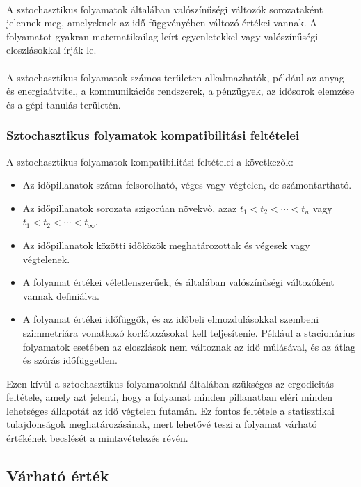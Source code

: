 \documentclass[11pt,a4paper]{article}
\begin{document}
				\paragraph{}
					A sztochasztikus folyamatok általában valószínűségi változók sorozataként jelennek meg, amelyeknek az idő függvényében változó értékei vannak. A folyamatot gyakran matematikailag leírt egyenletekkel vagy valószínűségi eloszlásokkal írják le.
				\paragraph{}
					A sztochasztikus folyamatok számos területen alkalmazhatók, például az anyag- és energiaátvitel, a kommunikációs rendszerek, a pénzügyek, az idősorok elemzése és a gépi tanulás területén.
				\subsubsection{Sztochasztikus folyamatok kompatibilitási feltételei}
					A sztochasztikus folyamatok kompatibilitási feltételei a következők:
					\begin{itemize}
					   \item Az időpillanatok száma felsorolható, véges vagy végtelen, de számontartható.
					   \item Az időpillanatok sorozata szigorúan növekvő, azaz $t_1 < t_2 < \cdots < t_n$ vagy $t_1 < t_2 < \cdots < t_{\infty}$.
					   \item Az időpillanatok közötti időközök meghatározottak és végesek vagy végtelenek.
					   \item A folyamat értékei véletlenszerűek, és általában valószínűségi változóként vannak definiálva.
					   \item A folyamat értékei időfüggők, és az időbeli elmozdulásokkal szembeni szimmetriára vonatkozó korlátozásokat kell teljesítenie. Például a stacionárius folyamatok esetében az eloszlások nem változnak az idő múlásával, és az átlag és szórás időfüggetlen.
					\end{itemize}
					Ezen kívül a sztochasztikus folyamatoknál általában szükséges az ergodicitás feltétele, amely azt jelenti, hogy a folyamat minden pillanatban eléri minden lehetséges állapotát az idő végtelen futamán. Ez fontos feltétele a statisztikai tulajdonságok meghatározásának, mert lehetővé teszi a folyamat várható értékének becslését a mintavételezés révén.
			\subsection{Várható érték}
\end{document}
